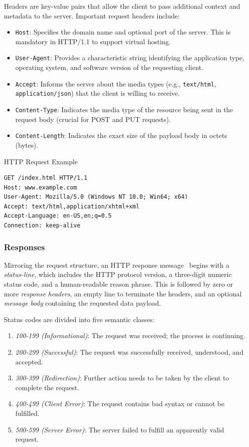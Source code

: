 Headers are key-value pairs that allow the client to pass additional context and metadata to the server. Important request headers include:
\begin{itemize}
    \item \texttt{Host}: Specifies the domain name and optional port of the server. This is mandatory in HTTP/1.1 to support virtual hosting.
    \item \texttt{User-Agent}: Provides a characteristic string identifying the application type, operating system, and software version of the requesting client.
    \item \texttt{Accept}: Informs the server about the media types (e.g., \texttt{text/html}, \texttt{application/json}) that the client is willing to receive.
    \item \texttt{Content-Type}: Indicates the media type of the resource being sent in the request body (crucial for POST and PUT requests).
    \item \texttt{Content-Length}: Indicates the exact size of the payload body in octets (bytes).
\end{itemize}

\begin{example}{HTTP Request Example}
\begin{verbatim}
GET /index.html HTTP/1.1
Host: www.example.com
User-Agent: Mozilla/5.0 (Windows NT 10.0; Win64; x64)
Accept: text/html,application/xhtml+xml
Accept-Language: en-US,en;q=0.5
Connection: keep-alive
\end{verbatim}
\end{example}

\subsubsection{Responses}
Mirroring the request structure, an HTTP response message~\cite{rfc9112} begins with a \emph{status-line}, which includes the HTTP protocol version, a three-digit numeric status code, and a human-readable reason phrase. This is followed by zero or more \emph{response headers}, an empty line to terminate the headers, and an optional \emph{message body} containing the requested data payload.

Status codes are divided into five semantic classes:
\begin{enumerate}
    \item \emph{100-199 (Informational)}: The request was received; the process is continuing.
    \item \emph{200-299 (Successful)}: The request was successfully received, understood, and accepted.
    \item \emph{300-399 (Redirection)}: Further action needs to be taken by the client to complete the request.
    \item \emph{400-499 (Client Error)}: The request contains bad syntax or cannot be fulfilled.
    \item \emph{500-599 (Server Error)}: The server failed to fulfill an apparently valid request.
\end{enumerate}

